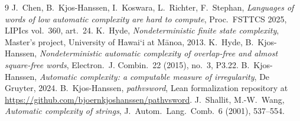 \documentclass[11pt]{article}
\newcommand{\okina}{\textquoteleft}
\theoremstyle{definition}
\begin{document}
\begin{thebibliography}{9}
 J.~Chen, B.~Kjos-Hanssen, I.~Koswara, L.~Richter,
F.~Stephan, \emph{Languages of words of low automatic complexity are hard
to compute}, Proc.\ FSTTCS 2025, LIPIcs vol.\ 360, art.\ 24.
 K.~Hyde, \emph{Nondeterministic finite state complexity}, Master's project, University of Hawai\okina i at M\=anoa, 2013.
 K.~Hyde, B.~Kjos-Hanssen, \emph{Nondeterministic automatic
complexity of overlap-free and almost square-free words}, Electron.\ J.
Combin.\ 22 (2015), no.\ 3, P3.22.
 B.~Kjos-Hanssen, \emph{Automatic complexity: a computable
measure of irregularity}, De Gruyter, 2024.
 B.~Kjos-Hanssen, \emph{pathvsword}, Lean formalization repository at \url{https://github.com/bjoernkjoshanssen/pathvsword}.
 J.~Shallit, M.-W.~Wang, \emph{Automatic complexity of
strings}, J.~Autom.\ Lang.\ Comb.\ 6 (2001), 537--554.
\end{thebibliography}
\end{document}
